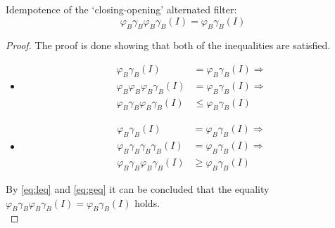 \begin{thm}
    Idempotence of the `closing-opening' alternated filter:
    $$
    \varphi_B\gamma_B\varphi_B\gamma_B(I) = \varphi_B\gamma_B(I)
    $$

    \begin{proof}
        The proof is done showing that both of the inequalities are satisfied.
        \begin{itemize}
            \item[]
            \noindent{}
            \begin{equation}
            \begin{aligned}
                \varphi_B\gamma_B(I) &= \varphi_B\gamma_B(I) \Rightarrow \\
                \varphi_B\varphi_B\varphi_B\gamma_B(I) &= \varphi_B\gamma_B(I) \Rightarrow \\
                \varphi_B\gamma_B\varphi_B\gamma_B(I) &\leq \varphi_B\gamma_B(I)
            \end{aligned}
            \label{eq:leq}
            \end{equation}
            \item[]
            \noindent{}
            \begin{equation}
            \begin{aligned}
                \varphi_B\gamma_B(I) &= \varphi_B\gamma_B(I) \Rightarrow \\
                \varphi_B\gamma_B\gamma_B\gamma_B(I) &= \varphi_B\gamma_B(I) \Rightarrow \\
                \varphi_B\gamma_B\varphi_B\gamma_B(I) &\geq \varphi_B\gamma_B(I)
            \end{aligned}
            \label{eq:geq}
            \end{equation}
        \end{itemize}
        By \eqref{eq:leq} and \eqref{eq:geq} it can be concluded that the equality $\varphi_B\gamma_B\varphi_B\gamma_B(I) = \varphi_B\gamma_B(I)$ holds. \\
    \end{proof}
\end{thm}